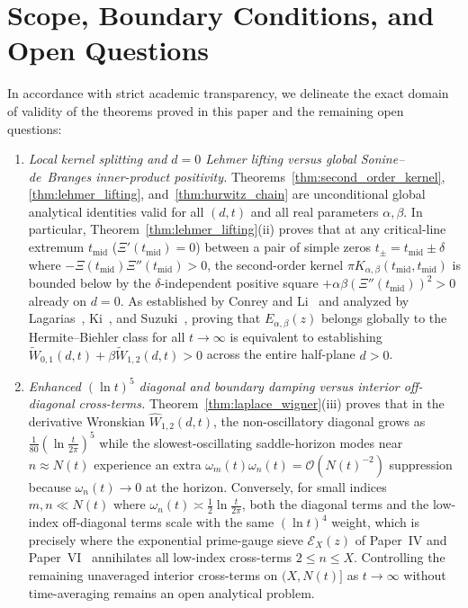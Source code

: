 \documentclass[11pt,reqno]{amsart}
\theoremstyle{definition}
\theoremstyle{remark}
\numberwithin{equation}{section}
\begin{document}
\section{Scope, Boundary Conditions, and Open Questions}\label{sec:scope}

In accordance with strict academic transparency, we delineate the exact domain of validity of the theorems proved in this paper and the remaining open questions:
\begin{enumerate}[label=\textup{(\arabic*)},leftmargin=2.2em]
\item \textit{Local kernel splitting and $d = 0$ Lehmer lifting versus global Sonine--de~Branges inner-product positivity.} Theorems~\ref{thm:second_order_kernel}, \ref{thm:lehmer_lifting}, and~\ref{thm:hurwitz_chain} are unconditional global analytical identities valid for all $(d,t)$ and all real parameters $\alpha, \beta$. In particular, Theorem~\ref{thm:lehmer_lifting}(ii) proves that at any critical-line extremum $t_{\mathrm{mid}}$ ($\Xi'(t_{\mathrm{mid}}) = 0$) between a pair of simple zeros $t_\pm = t_{\mathrm{mid}} \pm \delta$ where $-\Xi(t_{\mathrm{mid}})\Xi''(t_{\mathrm{mid}}) > 0$, the second-order kernel $\pi K_{\alpha,\beta}(t_{\mathrm{mid}}, t_{\mathrm{mid}})$ is bounded below by the $\delta$-independent positive square $+\alpha\beta(\Xi''(t_{\mathrm{mid}}))^2 > 0$ already on $d = 0$. As established by Conrey and Li~\cite{conreyli2000} and analyzed by Lagarias~\cite{lagarias2006}, Ki~\cite{ki2008}, and Suzuki~\cite{suzuki2011}, proving that $E_{\alpha,\beta}(z)$ belongs globally to the Hermite--Biehler class for all $t \to \infty$ is equivalent to establishing $\widetilde{W}_{0,1}(d,t) + \beta\widetilde{W}_{1,2}(d,t) > 0$ across the entire half-plane $d > 0$.
\item \textit{Enhanced $(\ln t)^5$ diagonal and boundary damping versus interior off-diagonal cross-terms.} Theorem~\ref{thm:laplace_wigner}(iii) proves that in the derivative Wronskian $\widehat{W}_{1,2}(d,t)$, the non-oscillatory diagonal grows as $\frac{1}{80}(\ln\frac{t}{2\pi})^5$ while the slowest-oscillating saddle-horizon modes near $n \approx N(t)$ experience an extra $\omega_m(t)\omega_n(t) = \mathcal{O}(N(t)^{-2})$ suppression because $\omega_n(t) \to 0$ at the horizon. Conversely, for small indices $m, n \ll N(t)$ where $\omega_n(t) \asymp \frac{1}{2}\ln\frac{t}{2\pi}$, both the diagonal terms and the low-index off-diagonal terms scale with the same $(\ln t)^4$ weight, which is precisely where the exponential prime-gauge sieve $\mathcal{E}_X(z)$ of Paper~IV and Paper~VI~\cite{missiaen2026paper4,missiaen2026paper6} annihilates all low-index cross-terms $2 \le n \le X$. Controlling the remaining unaveraged interior cross-terms on $(X, N(t)]$ as $t \to \infty$ without time-averaging remains an open analytical problem.
\end{enumerate}
\end{document}
